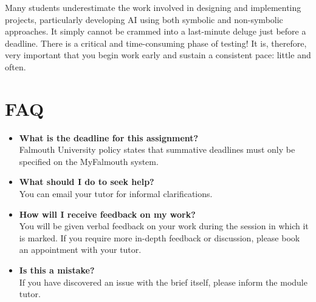 \documentclass{../fal_assignment}
\begin{document}
Many students underestimate the work involved in designing and implementing projects, particularly developing AI using both symbolic and non-symbolic approaches. It simply cannot be crammed into a last-minute deluge just before a deadline. There is a critical and time-consuming phase of testing! It is, therefore, very important that you begin work early and sustain a consistent pace: little and often.

\section*{FAQ}

\begin{itemize}
	\item 	\textbf{What is the deadline for this assignment?} \\ 
    		Falmouth University policy states that summative deadlines must only be specified on the MyFalmouth system.
    		
	\item 	\textbf{What should I do to seek help?} \\ 
    		You can email your tutor for informal clarifications.  
    		
	\item 	\textbf{How will I receive feedback on my work?} \\ 
    		You will be given verbal feedback on your work during the session in which it is marked.
    		If you require more in-depth feedback or discussion, please book an appointment with your tutor.
    		
    	\item 	\textbf{Is this a mistake?} \\ 	
    		If you have discovered an issue with the brief itself, please inform the module tutor.
    		
\end{itemize}
\end{document}
